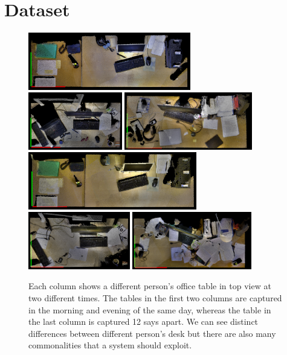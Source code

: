 \documentclass[letterpaper, 10 pt, conference]{ieeeconf}  %
\begin{document}
\section{Dataset}
\label{sec:Dataset}

\begin{figure}
\begin{center}
\includegraphics[height=2.5cm]{David_Mor_131110} \quad
\includegraphics[height=2.5cm]{Nils_Mor_131111} \quad
\includegraphics[height=2.5cm]{Puren_Eve_131029}\\ \smallskip
\includegraphics[height=2.5cm]{David_Eve_131110} \enskip
\includegraphics[height=2.5cm]{Nils_Eve_131111} \enskip
\includegraphics[height=2.5cm]{Puren_Mor_131110}
\caption{Each column shows a different person's office table in top view at two different times. The tables in the first two columns are captured in the morning and evening of the same day, whereas the table in the last column is captured 12 says apart. We can see distinct differences between different person's desk but there are also many commonalities that a system should exploit. }
\label{fig:Example Scenes}
\end{center}
\end{figure}
\end{document}
